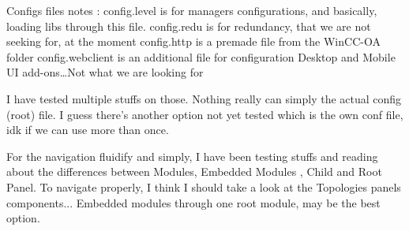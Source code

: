 \documentclass[a4paper, 10pt]{article}
\begin{document}
Configs files notes : 
config.level is for managers configurations, and basically, loading libs through this file.
config.redu is for redundancy, that we are not seeking for, at the moment
config.http is a premade file from the WinCC-OA folder
config.webclient is an additional file for configuration Desktop and Mobile UI add-ons\dots Not what we are looking for

I have tested multiple stuffs on those. Nothing really can simply the actual config (root) file.
I guess there's another option not yet tested which is the own conf file, idk if we can use more than once.

For the navigation fluidify and simply, I have been testing stuffs and reading about the differences between Modules, Embedded Modules , Child and Root Panel.
To navigate properly, I think I should take a look at the Topologies panels components...
Embedded modules through one root module, may be the best option.
\end{document}
